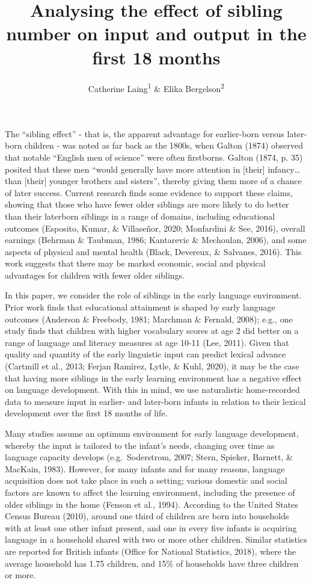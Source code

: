 \documentclass[
  english,
  man,floatsintext]{apa6}
\title{Analysing the effect of sibling number on input and output in the first 18 months}
\author{Catherine Laing\textsuperscript{1} \& Elika Bergelson\textsuperscript{2}}
\date{}
\affiliation{\vspace{0.5cm}\textsuperscript{1} University of York, York, UK\\\textsuperscript{2} Duke University, Durham, NC, USA}
\begin{document}
\maketitle

The \enquote{sibling effect} - that is, the apparent advantage for earlier-born versus later-born children - was noted as far back as the 1800s, when Galton (1874) observed that notable \enquote{English men of science} were often firstborns. Galton (1874, p. 35) posited that these men \enquote{would generally have more attention in {[}their{]} infancy\ldots than {[}their{]} younger brothers and sisters}, thereby giving them more of a chance of later success. Current research finds some evidence to support these claims, showing that those who have fewer older siblings are more likely to do better than their laterborn siblings in a range of domains, including educational outcomes (Esposito, Kumar, \& Villaseñor, 2020; Monfardini \& See, 2016), overall earnings (Behrman \& Taubman, 1986; Kantarevic \& Mechoulan, 2006), and some aspects of physical and mental health (Black, Devereux, \& Salvanes, 2016). This work suggests that there may be marked economic, social and physical advantages for children with fewer older siblings.

In this paper, we consider the role of siblings in the early language environment. Prior work finds that educational attainment is shaped by early language outcomes (Anderson \& Freebody, 1981; Marchman \& Fernald, 2008); e.g., one study finds that children with higher vocabulary scores at age 2 did better on a range of language and literacy measures at age 10-11 (Lee, 2011). Given that quality and quantity of the early linguistic input can predict lexical advance (Cartmill et al., 2013; Ferjan Ramírez, Lytle, \& Kuhl, 2020), it may be the case that having more siblings in the early learning environment has a negative effect on language development. With this in mind, we use naturalistic home-recorded data to measure input in earlier- and later-born infants in relation to their lexical development over the first 18 months of life.

Many studies assume an optimum environment for early language development, whereby the input is tailored to the infant's needs, changing over time as language capacity develops (e.g.~Soderstrom, 2007; Stern, Spieker, Barnett, \& MacKain, 1983). However, for many infants and for many reasons, language acquisition does not take place in such a setting; various domestic and social factors are known to affect the learning environment, including the presence of older siblings in the home (Fenson et al., 1994). According to the United States Census Bureau (2010), around one third of children are born into households with at least one other infant present, and one in every five infants is acquiring language in a household shared with two or more other children. Similar statistics are reported for British infants (Office for National Statistics, 2018), where the average household has 1.75 children, and 15\% of households have three children or more.
\end{document}
